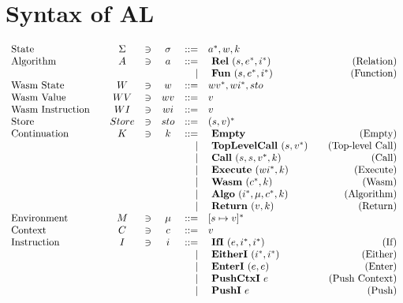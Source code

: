 \section{Syntax of AL}
\label{syntax}

\begin{align*}
\begin{array}{lcccrlr}
%
  \text{State}\quad& \Sigma &\ni& \sigma & ::=& \seq a, w, k \\
%
  \text{Algorithm}\quad& A &\ni& a &::=& ~ \rel ~ (s, \seq e, \seq i) &\quad\text{(Relation)} \\
  &&&& | & ~ \fun ~ (s, \seq e, \seq i) &\quad\text{(Function)} \\
%
  \text{Wasm State}\quad& W &\ni& w &::=& \seq{wv}, \seq{wi}, sto \\
  \text{Wasm Value}\quad& WV &\ni& wv &::=& v \\
  \text{Wasm Instruction}\quad& WI &\ni& wi &::=& v \\
%
  \text{Store}\quad& Store &\ni& sto &::=& \seq{(s, v)} \\
%
  \text{Continuation}\quad & K &\ni& k &::=& ~ \mt &\quad\text{(Empty)} \\
    &&&& | & ~ \toplevelcall ~ (s, \seq v) &\quad\text{(Top-level Call)} \\
    &&&& | & ~ \call ~ (s, s, \seq v, k) &\quad\text{(Call)} \\
    &&&& | & ~ \exe ~ (\seq{wi}, k) &\quad\text{(Execute)} \\
    &&&& | & ~ \wasm ~ (\seq c, k) &\quad\text{(Wasm)} \\
    &&&& | & ~ \algo ~ (\seq i, \mu, \seq c, k) &\quad\text{(Algorithm)} \\
    &&&& | & ~ \ret ~ (v, k) &\quad\text{(Return)} \\
%
  \text{Environment}\quad& M &\ni& \mu &::=& \seq{[s \mapsto v]} \\
%
  \text{Context}\quad& C &\ni& c &::=& v \\
%
  \text{Instruction}\quad& I &\ni& i &::=& ~ \ifi ~ (e, \seq i, \seq i) &\quad\text{(If)} \\
    &&&& | & ~ \eitheri ~ (\seq i, \seq i) &\quad\text{(Either)} \\
    &&&& | & ~ \enteri ~ (e, e) &\quad\text{(Enter)} \\
    &&&& | & ~ \pushctxi ~ e &\quad\text{(Push Context)} \\
    &&&& | & ~ \pushi ~ e &\quad\text{(Push)} \\

\end{array}
\end{align*}
